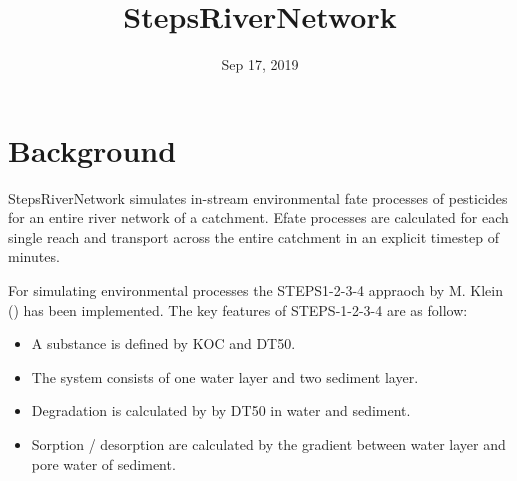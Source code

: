 \documentclass[letterpaper,10pt,english]{sphinxmanual}
\title{StepsRiverNetwork}
\date{Sep 17, 2019}
\author{}
\begin{document}
\pagestyle{empty}
\maketitle
\pagestyle{plain}
\sphinxtableofcontents
\pagestyle{normal}
\label{\detokenize{index::doc}}
\begin{figure}[htbp]
\centering

\noindent{}
\end{figure}




\chapter{Background}
\label{\detokenize{index:background}}
StepsRiverNetwork simulates in-stream environmental fate processes of pesticides for
an entire river network of a catchment. Efate processes are calculated for each single
reach and transport across the entire catchment in an explicit timestep of minutes.

\begin{figure}[htbp]
\centering

\noindent{}
\end{figure}

For simulating environmental processes the
STEPS1-2-3-4 appraoch by M. Klein () has been implemented. The key features of STEPS-1-2-3-4 are as follow:
\begin{itemize}
\item {} 
A substance is defined by KOC and DT50.

\item {} 
The system consists of one water layer and two sediment layer.

\item {} 
Degradation is calculated by by DT50 in water and sediment.

\item {} 
Sorption / desorption are calculated by the gradient between water layer and pore water of sediment.

\end{itemize}

\begin{figure}[htbp]
\centering

\noindent{}
\end{figure}
\end{document}
